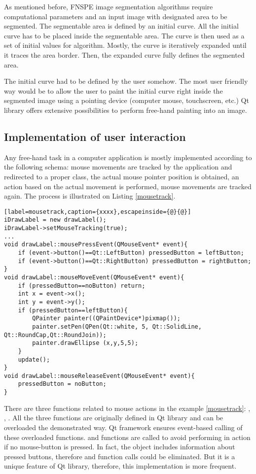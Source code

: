 As mentioned before, FNSPE image segmentation algorithms require computational parameters and an input image with designated area to be segmented. The segmentable area is defined by an initial curve. All the initial curve has to be placed inside the segmentable area. The curve is then used as a set of initial values for algorithm. Mostly, the curve is iteratively expanded until it traces the area border. Then, the expanded curve fully defines the segmented area.

The initial curve had to be defined by the user somehow. The most user friendly way would be to allow the user to paint the initial curve right inside the segmented image using a pointing device (computer mouse, touchscreen, etc.) Qt library offers extensive possibilities to perform free-hand painting into an image.

\subsection{Implementation of user interaction}

Any free-hand task in a computer application is mostly implemented according to the following schema: mouse movements are tracked by the application and redirected to a proper class, the actual mouse pointer position is obtained, an action based on the actual movement is performed, mouse movements are tracked again. The process is illustrated on Listing \ref{mousetrack}.

\begin{lstlisting}[label=mousetrack,caption={xxxx},escapeinside={@}{@}]
iDrawLabel = new drawLabel();
iDrawLabel->setMouseTracking(true);
...
void drawLabel::mousePressEvent(QMouseEvent* event){
	if (event->button()==Qt::LeftButton) pressedButton = leftButton;
	if (event->button()==Qt::RightButton) pressedButton = rightButton;
}
void drawLabel::mouseMoveEvent(QMouseEvent* event){
	if (pressedButton==noButton) return;
	int x = event->x();
	int y = event->y();
	if (pressedButton==leftButton){
		QPainter painter((QPaintDevice*)pixmap());
		painter.setPen(QPen(Qt::white, 5, Qt::SolidLine, Qt::RoundCap,Qt::RoundJoin));
		painter.drawEllipse (x,y,5,5);
	}
	update();
}
void drawLabel::mouseReleaseEvent(QMouseEvent* event){
	pressedButton = noButton;
}
\end{lstlisting}

There are three functions related to mouse actions in the example \ref{mousetrack}: , , . All the three functions are originally defined in Qt library and can be overloaded the demonstrated way. Qt framework ensures event-based calling of these overloaded functions.  and  functions are called to avoid performing in  action if no mouse-button is pressed. In fact, the  object includes information about pressed buttons, therefore  and  function calls could be eliminated. But it is a unique feature of Qt library, therefore, this implementation is more frequent.